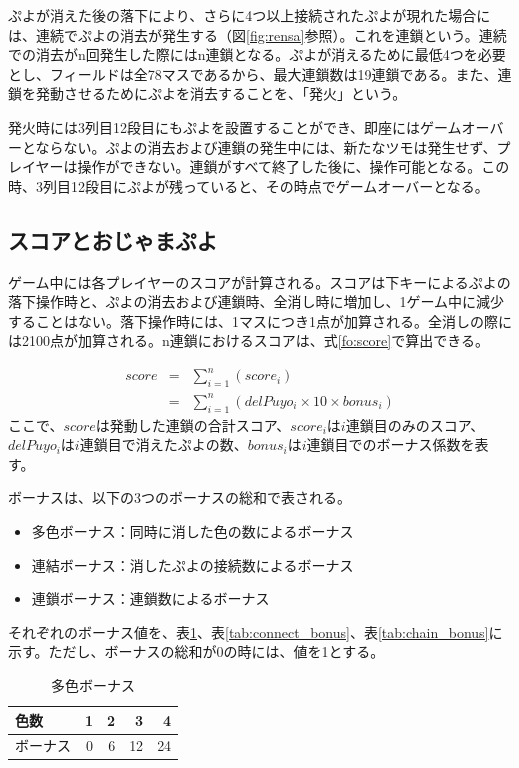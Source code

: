 \documentclass[12pt]{jarticle}
\begin{document}
ぷよが消えた後の落下により、さらに4つ以上接続されたぷよが現れた場合には、連続でぷよの消去が発生する（図\ref{fig:rensa}参照）。これを連鎖という。連続での消去がn回発生した際にはn連鎖となる。ぷよが消えるために最低4つを必要とし、フィールドは全78マスであるから、最大連鎖数は19連鎖である。また、連鎖を発動させるためにぷよを消去することを、「発火」という。

発火時には3列目12段目にもぷよを設置することができ、即座にはゲームオーバーとならない。ぷよの消去および連鎖の発生中には、新たなツモは発生せず、プレイヤーは操作ができない。連鎖がすべて終了した後に、操作可能となる。この時、3列目12段目にぷよが残っていると、その時点でゲームオーバーとなる。

\subsection{スコアとおじゃまぷよ} \label{score_ojama}
ゲーム中には各プレイヤーのスコアが計算される。スコアは下キーによるぷよの落下操作時と、ぷよの消去および連鎖時、全消し時に増加し、1ゲーム中に減少することはない。落下操作時には、1マスにつき1点が加算される。全消しの際には2100点が加算される。n連鎖におけるスコアは、式\ref{fo:score}で算出できる。

\begin{eqnarray} \label{fo:score}
score & = & \sum_{i=1}^{n}(score_{i}) \nonumber \\
& = & \sum_{i=1}^{n}(delPuyo_{i} \times 10 \times bonus_{i})
\end{eqnarray}
ここで、$score$は発動した連鎖の合計スコア、$score_{i}$は$i$連鎖目のみのスコア、$delPuyo_{i}$は$i$連鎖目で消えたぷよの数、$bonus_{i}$は$i$連鎖目でのボーナス係数を表す。

ボーナスは、以下の3つのボーナスの総和で表される。
\begin{itemize}
\item 多色ボーナス：同時に消した色の数によるボーナス
\item 連結ボーナス：消したぷよの接続数によるボーナス
\item 連鎖ボーナス：連鎖数によるボーナス
\end{itemize}
それぞれのボーナス値を、表\ref{tab:color_bonus}、表\ref{tab:connect_bonus}、表\ref{tab:chain_bonus}に示す。ただし、ボーナスの総和が0の時には、値を1とする。

\begin{table}[htb]
\begin{center}
\caption{多色ボーナス} \label{tab:color_bonus}
\begin{tabular}{|l|r|r|r|r|} \hline
色数 & 1 & 2 & 3 & 4\\ \hline
ボーナス & 0 & 6 & 12 & 24\\ \hline
\end{tabular}
\end{center}
\end{table}
\end{document}
